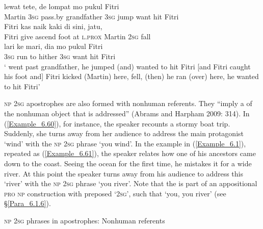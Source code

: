 \ea
\label{Example_6.59}
 {{}} {{lewat}} {{tete,}} {{de}} {{lompat}} {{mo}} {pukul} {Fitri}\\ %
 {Martin}  {\textsc{3sg}}  {pass.by}  {grandfather}  {\textsc{3sg}}  {jump}  {want}  hit  Fitri\\
 \gll {\ldots} {Fitri}  {kas}  {naik}  {kaki}  di  {sini,}  {}    {jatu,}\\
  { }  {Fitri}  {give}  {ascend}  {foot}  at  {\textsc{l.prox}}  {Martin}  \textsc{2sg}  {fall}\\
   {lari}  {ke}  {mari,}  {dia}  {mo}  {pukul}  {Fitri}\\
 {\textsc{3sg}}  {run}  {to}  {hither}  {\textsc{3sg}}  {want}  {hit}  {Fitri}\\

 ‘ went past grandfather, he jumped (and) wanted to hit Fitri [and Fitri caught his foot and] Fitri kicked (Martin) here,  fell, (then) he ran (over) here, he wanted to hit Fitri’ \textstyleExampleSource{[081015-001-Cv.0018-0019]}
\z


\textsc{np} \textsc{2sg} apostrophes are also formed with nonhuman referents. They “imply a \textit{ }of the nonhuman object that is addressed” {(Abrams and Harpham 2009: 314)}. In (\ref{Example_6.60}), for instance, the speaker recounts a stormy boat trip. Suddenly, she turns away from her audience to address the main protagonist  ‘wind’ with the \textsc{np} \textsc{2sg}  phrase  ‘you wind’. In the example in (\ref{Example_6.1}), repeated as (\ref{Example_6.61}), the speaker relates how one of his ancestors came down to the coast. Seeing the ocean for the first time, he mistakes it for a wide river. At this point the speaker turns away from his audience to address this  ‘river’ with the \textsc{np} \textsc{2sg}  phrase  ‘you river’. Note that the  is part of an appositional \textsc{pro} \textsc{np} construction with preposed  ‘\textsc{2sg}’, such that  ‘you, you river’ (see §\ref{Para_6.1.6}).



\begin{styleExampleTitle}
\textsc{np} \textsc{2sg}  phrases in apostrophes: Nonhuman referents
\end{styleExampleTitle}

